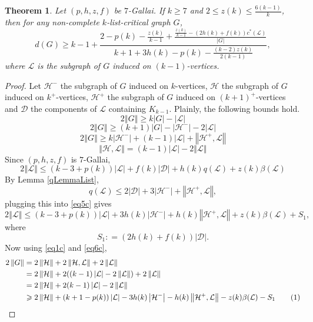 \documentclass[10pt]{article}
\renewcommand{\ge}{\geqslant}
\renewcommand{\le}{\leqslant}
\theoremstyle{plain}
\newtheorem{thm}{Theorem}[section]
\theoremstyle{definition}
\theoremstyle{remark}
\newcommand{\fancy}[1]{\mathcal{#1}}
\newcommand{\D}{\fancy{D}}
\renewcommand{\L}{\fancy{L}}
\newcommand{\HH}{\fancy{H}}
\newcommand{\card}[1]{\left|#1\right|}
\newcommand{\size}[1]{\left\Vert#1\right\Vert}
\newcommand{\parens}[1]{\left( #1 \right)}
\newcommand{\DefinedAs}{\mathrel{\mathop:}=}
\def\D{\fancy{D}}
\newcommand\numberthis{\addtocounter{equation}{1}\tag{\theequation}}
\begin{document}
\begin{thm}\label{k7}
	Let $\parens{p,h,z,f}$ be $7$-Gallai.  If $k \ge 7$ and $2 \le z(k) \le \frac{6(k-1)}{k}$, then for any non-complete $k$-list-critical graph $G$,
	\[d(G) \ge k-1 + \frac{2 - p(k) - \frac{z(k)}{k-1} + \frac{\frac{z(k)}{k-1} - (2h(k) + f(k))c^*(\L)}{\card{G}}}{k+1 + 3h(k) - p(k) - \frac{(k-2)z(k)}{2(k-1)}},\]
	where $\L$ is the subgraph of $G$ induced on $(k-1)$-vertices.
\end{thm}
\begin{proof}
Let $\HH^-$ the subgraph of $G$ induced on $k$-vertices, $\HH$ the subgraph of $G$ induced on $k^+$-vertices, 
$\HH^+$ the subgraph of $G$ induced on $(k+1)^+$-vertices and $\D$ the components of $\L$ containing $K_{k-1}$.
Plainly, the following bounds hold.
\begin{equation}\label{eq1c}
2\size{G} \ge k\card{G} - \card{\L}
\end{equation}
\begin{equation}\label{eq2c}
2\size{G} \ge (k+1)\card{G} - \card{\HH^-} - 2\card{\L}
\end{equation}
\begin{equation}\label{eq3c}
2\size{G} \ge k\card{\HH^-} + (k-1)\card{\L} + \size{\HH^+, \L}
\end{equation}
\begin{equation}\label{eq4c}
\size{\HH,\L} = (k-1)\card{\L} - 2\size{\L}
\end{equation}
Since $\parens{p,h,z,f}$ is $7$-Gallai,
\begin{equation}\label{eq5c}
2\size{\L} \le \parens{k-3 + p(k)}\card{\L} + f(k)\card{\D} + h(k)q(\L) + z(k)\beta(\L)
\end{equation}
By Lemma \ref{qLemmaList},
\[q(\L) \le 2\card{\D} + 3\card{\HH^-} + \size{\HH^+, \L},\]
plugging this into \eqref{eq5c} gives
\begin{equation}\label{eq6c}
2\size{\L} \le \parens{k-3 + p(k)}\card{\L} + 3h(k)\card{\HH^-} + h(k)\size{\HH^+, \L} + z(k)\beta(\L) + S_1,
\end{equation}
where
\[S_1 \DefinedAs (2h(k) + f(k))\card{\D}.\]
Now using \eqref{eq1c} and \eqref{eq6c},
\begin{align*}
	2\size{G} &= 2\size{\HH} + 2\size{\HH, \L} + 2\size{\L}\\
	&= 2\size{\HH} + 2((k-1)\card{\L} - 2\size{\L}) + 2\size{\L}\\
	&= 2\size{\HH} + 2(k-1)\card{\L} - 2\size{\L}\\
	&\ge 2\size{\HH} + \parens{k+1 - p(k)}\card{\L} - 3h(k)\card{\HH^-} - h(k)\size{\HH^+, \L} - z(k)\beta(\L) - S_1\numberthis \label{eq7c}\\

\end{align*}
\end{proof}
\end{document}
